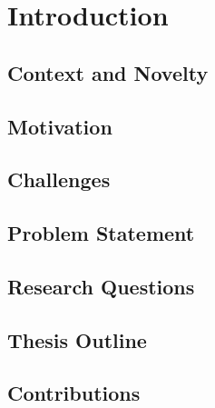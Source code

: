 
\chapter{Introduction}
\section{Context and Novelty}
\section{Motivation}
\section{Challenges}
\section{Problem Statement}
\section{Research Questions}
\section{Thesis Outline}
\section{Contributions}